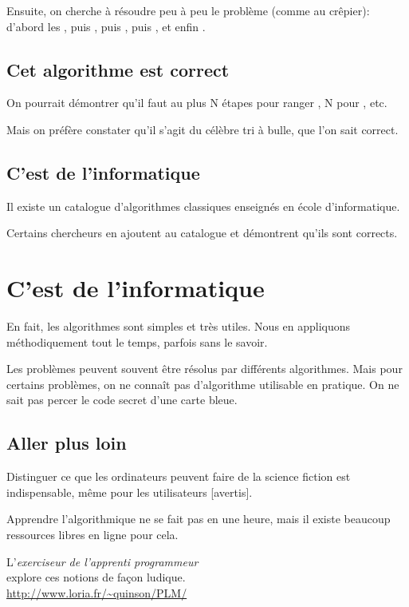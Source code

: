 \documentclass[a7paper,pagesize,DIV=14,10pt]{scrbook}
\begin{document}
Ensuite, on cherche à résoudre peu à peu le problème (comme au
crêpier): d'abord les , puis , puis ,
puis , et enfin .

\vspace{-.8\baselineskip}
\subsection*{Cet algorithme est correct}
\vspace{-.5\baselineskip}

On pourrait démontrer qu'il faut au plus N étapes pour ranger
, N pour , etc.

Mais on préfère constater qu'il s'agit du célèbre tri à bulle, que
l'on sait correct.

\vspace{-.8\baselineskip}
\subsection*{C'est de l'informatique}
\vspace{-.5\baselineskip}

Il existe un catalogue d'algorithmes classiques enseignés en école
d'informatique.

Certains chercheurs en ajoutent au catalogue et démontrent qu'ils
sont corrects.


\newpage
\section*{C'est de l'informatique}
\vspace{-.5\baselineskip} %
En fait, les algorithmes sont simples et très utiles. Nous en
appliquons méthodiquement tout le temps, parfois sans le savoir.

Les problèmes peuvent souvent être résolus par différents algorithmes.
Mais pour certains problèmes, on ne connaît pas d'algorithme
utilisable en pratique. On ne sait pas percer le code secret d'une
carte bleue.

\vspace{-.5\baselineskip} %
\subsection*{Aller plus loin}
\vspace{-.5\baselineskip} %
Distinguer ce que les ordinateurs peuvent faire de la science fiction
est indispensable, même pour les utilisateurs [avertis].

Apprendre l'algorithmique ne se fait pas en une heure, mais il existe
beaucoup ressources libres en ligne pour cela.

L'\textit{exerciseur de l'apprenti programmeur}\\ explore
ces notions de façon ludique.\\
{\small\color{blue}\url{http://www.loria.fr/~quinson/PLM/}}
\end{document}

